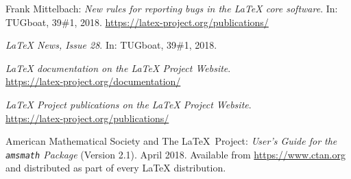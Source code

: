 \documentclass{ltnews}
\begin{document}
\begin{thebibliography}{9}

 Frank Mittelbach:
  \emph{New rules for reporting bugs in the \LaTeX{} core software}.
  In: TUGboat, 39\#1, 2018.
  \url{https://latex-project.org/publications/}

  \emph{\LaTeX{} News, Issue 28}.
  In: TUGboat, 39\#1, 2018.\\

  \emph{\LaTeX{} documentation on the \LaTeX{} Project Website}.\\
  \url{https://latex-project.org/documentation/}

  \emph{\LaTeX{} Project publications on the \LaTeX{} Project Website}.\\
  \url{https://latex-project.org/publications/}

 American Mathematical Society and The \LaTeX\ Project:
  \emph{User's Guide for the \texttt{amsmath} Package} (Version 2.1).
  April 2018.
  Available from
  \url{https://www.ctan.org}
  and distributed as part of every \LaTeX{} distribution.

\end{thebibliography}
\end{document}
